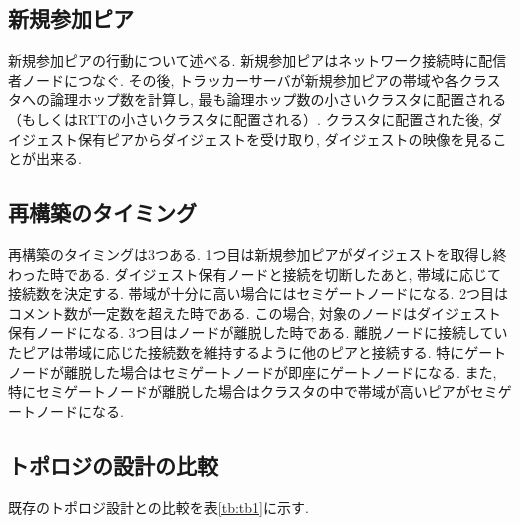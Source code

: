 \documentclass[letter]{ieicej}
\begin{document}
\subsection{新規参加ピア}
新規参加ピアの行動について述べる. 新規参加ピアはネットワーク接続時に配信者ノードにつなぐ. その後, トラッカーサーバが新規参加ピアの帯域や各クラスタへの論理ホップ数を計算し, 最も論理ホップ数の小さいクラスタに配置される（もしくはRTTの小さいクラスタに配置される）. クラスタに配置された後, ダイジェスト保有ピアからダイジェストを受け取り, ダイジェストの映像を見ることが出来る.

\subsection{再構築のタイミング}
再構築のタイミングは3つある. 1つ目は新規参加ピアがダイジェストを取得し終わった時である. ダイジェスト保有ノードと接続を切断したあと, 帯域に応じて接続数を決定する. 帯域が十分に高い場合にはセミゲートノードになる. 2つ目はコメント数が一定数を超えた時である. この場合, 対象のノードはダイジェスト保有ノードになる. 3つ目はノードが離脱した時である. 離脱ノードに接続していたピアは帯域に応じた接続数を維持するように他のピアと接続する. 特にゲートノードが離脱した場合はセミゲートノードが即座にゲートノードになる. また, 特にセミゲートノードが離脱した場合はクラスタの中で帯域が高いピアがセミゲートノードになる.

\subsection{トポロジの設計の比較}
既存のトポロジ設計との比較を表\ref{tb:tb1}に示す.
\end{document}
